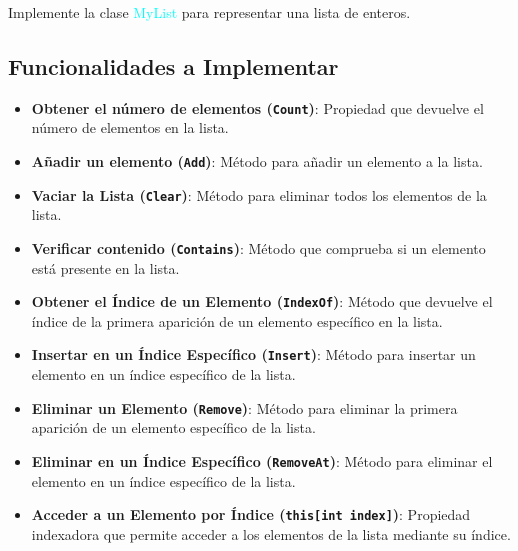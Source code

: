 Implemente la clase \textcolor{cyan}{MyList} para representar una lista de enteros. 

\subsection*{Funcionalidades a Implementar}
\begin{itemize}
    \item \textbf{Obtener el número de elementos (\texttt{Count})}: 
     Propiedad que devuelve el número de elementos en la lista.
    
    \item \textbf{Añadir un elemento (\texttt{Add})}:
     Método para añadir un elemento a la lista.
    
    \item \textbf{Vaciar la Lista (\texttt{Clear})}:
    Método para eliminar todos los elementos de la lista.
    
    \item \textbf{Verificar contenido (\texttt{Contains})}:
    Método que comprueba si un elemento está presente en la lista.
     
    \item \textbf{Obtener el Índice de un Elemento (\texttt{IndexOf})}:
    Método que devuelve el índice de la primera aparición de un elemento específico en la lista.
    
    \item \textbf{Insertar en un Índice Específico (\texttt{Insert})}:
    Método para insertar un elemento en un índice específico de la lista.
    
    \item \textbf{Eliminar un Elemento (\texttt{Remove})}:
    Método para eliminar la primera aparición de un elemento específico de la lista.
    
    \item \textbf{Eliminar en un Índice Específico (\texttt{RemoveAt})}:
    Método para eliminar el elemento en un índice específico de la lista.
    
    \item \textbf{Acceder a un Elemento por Índice (\texttt{this[int index]})}:
    Propiedad indexadora que permite acceder a los elementos de la lista mediante su índice.
\end{itemize}

